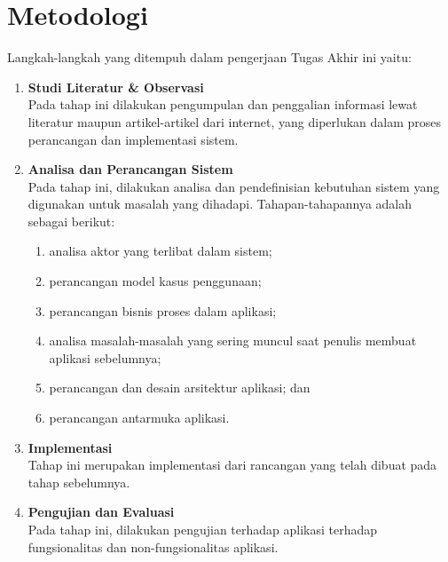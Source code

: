     \section{Metodologi}
    \label{metodologi}
	Langkah-langkah yang ditempuh dalam pengerjaan Tugas Akhir ini yaitu:
    \begin{enumerate}
    	\item \textbf{Studi Literatur \& Observasi} \\
		       Pada tahap ini dilakukan pengumpulan dan penggalian informasi lewat literatur maupun artikel-artikel dari internet, yang diperlukan dalam proses perancangan dan implementasi sistem.
    	\item \textbf{Analisa dan Perancangan Sistem}\\
		    	Pada tahap ini, dilakukan analisa dan pendefinisian kebutuhan sistem yang digunakan untuk masalah yang dihadapi. Tahapan-tahapannya adalah sebagai berikut:
		    	\begin{enumerate}[label=\alph*]
		    		\item analisa aktor yang terlibat dalam sistem;
		    		\item perancangan model kasus penggunaan;
		    		\item perancangan bisnis proses dalam aplikasi;
		    		\item analisa masalah-masalah yang sering muncul saat penulis membuat aplikasi sebelumnya;
		    		\item perancangan dan desain arsitektur aplikasi; dan
		    		\item perancangan antarmuka aplikasi.
		    	\end{enumerate}
    	\item \textbf{Implementasi}\\
		    	Tahap ini merupakan implementasi dari rancangan yang telah dibuat pada tahap sebelumnya.
    	\item \textbf{Pengujian dan Evaluasi}\\
		    	Pada tahap ini, dilakukan pengujian terhadap aplikasi terhadap fungsionalitas dan non-fungsionalitas aplikasi. 
	   	\end{enumerate}
	   	
